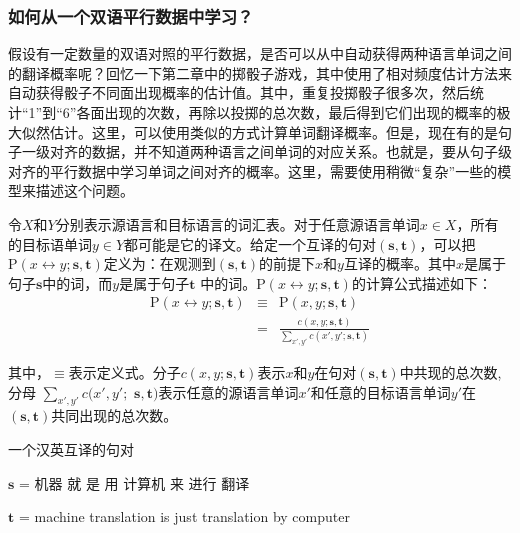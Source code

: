 \subsubsection{如何从一个双语平行数据中学习？}

\parinterval 假设有一定数量的双语对照的平行数据，是否可以从中自动获得两种语言单词之间的翻译概率呢？回忆一下第二章中的掷骰子游戏，其中使用了相对频度估计方法来自动获得骰子不同面出现概率的估计值。其中，重复投掷骰子很多次，然后统计``1''到``6''各面出现的次数，再除以投掷的总次数，最后得到它们出现的概率的极大似然估计。这里，可以使用类似的方式计算单词翻译概率。但是，现在有的是句子一级对齐的数据，并不知道两种语言之间单词的对应关系。也就是，要从句子级对齐的平行数据中学习单词之间对齐的概率。这里，需要使用稍微``复杂''一些的模型来描述这个问题。

令$X$和$Y$分别表示源语言和目标语言的词汇表。对于任意源语言单词$x \in X$，所有的目标语单词$y \in Y$都可能是它的译文。给定一个互译的句对$(\mathbf{s},\mathbf{t})$，可以把$\textrm{P}(x \leftrightarrow y; \mathbf{s}, \mathbf{t})$定义为：在观测到$(\mathbf{s},\mathbf{t})$的前提下$x$和$y$互译的概率。其中$x$是属于句子$\mathbf{s}$中的词，而$y$是属于句子$\mathbf{t}$ 中的词。$\textrm{P}(x \leftrightarrow y; \mathbf{s},\mathbf{t})$的计算公式描述如下：
\vspace{-0.5em}
\begin{eqnarray}
\textrm{P}(x \leftrightarrow y; \mathbf{s},\mathbf{t}) & \equiv & \textrm{P}(x,y;\mathbf{s},\mathbf{t})   \nonumber \\
                                                                             & =        & \frac{c(x,y;\mathbf{s},\mathbf{t})}{\sum_{x',y'} c(x',y';\mathbf{s},\mathbf{t})}
\label{eq:3-1}
\end{eqnarray}

\noindent 其中，$\equiv$表示定义式。分子$c(x,y;\mathbf{s},\mathbf{t})$表示$x$和$y$在句对$(\mathbf{s},\mathbf{t})$中共现的总次数,分母 $\sum_{x',y'} c(x',y';$ $\mathbf{s},\mathbf{t})$表示任意的源语言单词$x'$和任意的目标语言单词$y'$在$(\mathbf{s},\mathbf{t})$共同出现的总次数。

\begin{example}
一个汉英互译的句对

\qquad\qquad\quad $\mathbf{s}$ = 机器\; 就\; 是\; 用\; 计算机\; 来\; 进行\; {\color{red}翻译}

\qquad\qquad\quad $\mathbf{t}$ = machine\; {\color{red}translation}\; is\; just\; {\color{red}translation}\; by\; computer
\label{eg:3-1}
\end{example}

